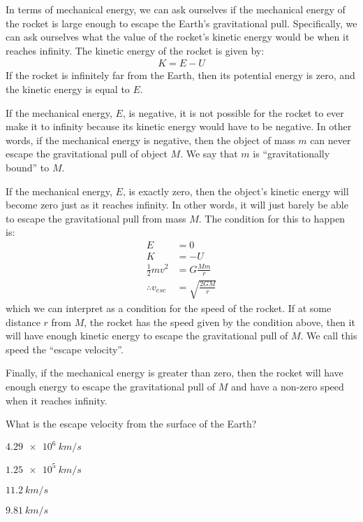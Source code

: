 In terms of mechanical energy, we can ask ourselves if the mechanical energy of the rocket is large enough to escape the Earth's gravitational pull. Specifically, we can ask ourselves what the value of the rocket's kinetic energy would be when it reaches infinity. The kinetic energy of the rocket is given by:
\begin{align*}
K = E - U
\end{align*} 
If the rocket is infinitely far from the Earth, then its potential energy is zero, and the kinetic energy is equal to $E$.

If the mechanical energy, $E$, is negative, it is not possible for the rocket to ever make it to infinity because its kinetic energy would have to be negative. In other words, if the mechanical energy is negative, then the object of mass $m$ can never escape the gravitational pull of object $M$. We say that $m$ is ``gravitationally bound'' to $M$.

If the mechanical energy, $E$, is exactly zero, then the object's kinetic energy will become zero just as it reaches infinity. In other words, it will just barely be able to escape the gravitational pull from mass $M$. The condition for this to happen is:
\begin{align*}
E &= 0\\
K & = -U\\
\frac{1}{2}mv^2 &= G\frac{Mm}{r}\\
\therefore v_{esc} &= \sqrt{\frac{2GM}{r}}
\end{align*}
which we can interpret as a condition for the speed of the rocket. If at some distance $r$ from $M$, the rocket has the speed given by the condition above, then it will have enough kinetic energy to escape the gravitational pull of $M$. We call this speed the ``escape velocity''. 

Finally, if the mechanical energy is greater than zero, then the rocket will have enough energy to escape the gravitational pull of $M$ and have a non-zero speed when it reaches infinity. 

\begin{checkpoint}
\begin{MCquestion}{What is the escape velocity from the surface of the Earth?}
\item $\SI{4.29e6}{km/s}$
\item $\SI{1.25e5}{km/s}$
\item $\SI{11.2}{km/s}$\correct
\item $\SI{9.81}{km/s}$
\end{MCquestion}
\end{checkpoint}

